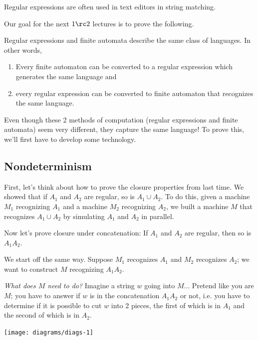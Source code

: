 Regular expressions are often used in text editors in string matching.  %

Our goal for the next $1\rc2$ lectures is to prove the following.
\begin{thm}
Regular expressions and finite automata describe the same class of languages. In other words,
\begin{enumerate}
\item
Every finite automaton can be converted to a regular expression which generates the same language and
\item
every regular expression can be converted to finite automaton that recognizes the same language.
\end{enumerate}
\end{thm}
Even though these 2 methods of computation (regular expressions and finite automata) seem very different, they capture the same language! To prove this, we'll first have to develop some technology.
%


\subsection{Nondeterminism}
First, let's think about how to prove the closure properties from last time. We showed that if $A_1$ and $A_2$ are regular, so is $A_1\cup A_2$.  To do this, given a machine $M_1$ recognizing $A_1$ and a machine $M_2$ recognizing $A_2$, we built a machine $M$ that recognizes $A_1\cup A_2$ by simulating $A_1$ and $A_2$ in parallel.

Now let's prove closure under concatenation: If $A_1$ and $A_2$ are regular, then so is $A_1A_2$.

We start off the same way. Suppose $M_1$ recognizes $A_1$ and $M_2$ recognizes $A_2$; we want to construct $M$ recognizing $A_1A_2$. 

{\it What does $M$ need to do?} Imagine a string $w$ going into $M$... Pretend like you are $M$; you have to answer if $w$ is in the concatenation $A_1A_2$ or not, i.e. you have to determine if it is possible to cut $w$ into 2 pieces, the first of which is in $A_1$ and the second of which is in $A_2$. %

\begin{center}
\texttt{[image: diagrams/diags-1]}
\end{center}

